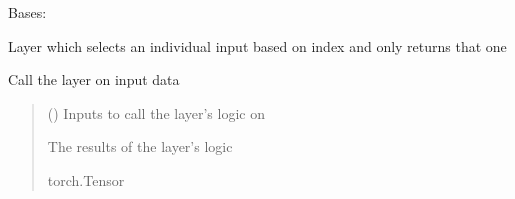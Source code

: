 \documentclass[letterpaper,10pt,english]{sphinxmanual}
\begin{document}
\begin{fulllineitems}
\label{\detokenize{beyondml.pt.layers:beyondml.pt.layers.SelectorLayer.SelectorLayer}}
\pysigstartsignatures
{}
\pysigstopsignatures
\sphinxAtStartPar
Bases: 

\sphinxAtStartPar
Layer which selects an individual input based on index and only returns that one

\begin{fulllineitems}
\label{\detokenize{beyondml.pt.layers:beyondml.pt.layers.SelectorLayer.SelectorLayer.forward}}
\pysigstartsignatures
{}
\pysigstopsignatures
\sphinxAtStartPar
Call the layer on input data
\begin{quote}\begin{description}
\sphinxAtStartPar
{} () \textendash{} Inputs to call the layer’s logic on

\sphinxAtStartPar
{} \textendash{} The results of the layer’s logic

\sphinxAtStartPar
torch.Tensor

\end{description}\end{quote}

\end{fulllineitems}


\begin{fulllineitems}
\label{\detokenize{beyondml.pt.layers:beyondml.pt.layers.SelectorLayer.SelectorLayer.sel_index}}
\pysigstartsignatures
{}
\pysigstopsignatures
\end{fulllineitems}


\end{fulllineitems}
\end{document}
